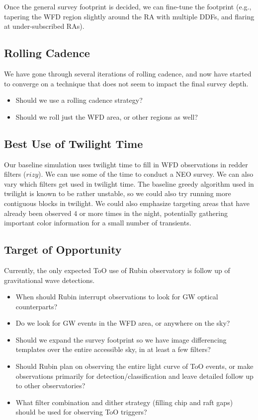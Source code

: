 Once the general survey footprint is decided, we can fine-tune the footprint (e.g., tapering the WFD region slightly around the RA with multiple DDFs, and flaring at under-subscribed RAs).

\subsection{Rolling Cadence}

We have gone through several iterations of rolling cadence, and now have started to converge on a technique that does not seem to impact the final survey depth. 

\begin{itemize}
    \item{Should we use a rolling cadence strategy?}
    \item{Should we roll just the WFD area, or other regions as well?}
\end{itemize}

\subsection{Best Use of Twilight Time}

Our baseline simulation uses twilight time to fill in WFD observations in redder filters ($rizy$). We can use some of the time to conduct a NEO survey. We can also vary which filters get used in twilight time. The baseline greedy algorithm used in twilight is known to be rather unstable, so we could also try running more contiguous blocks in twilight. We could also emphasize targeting areas that have already been observed 4 or more times in the night, potentially gathering important color information for a small number of transients.


\subsection{Target of Opportunity}

Currently, the only expected ToO use of Rubin observatory is follow up of gravitational wave detections.

\begin{itemize}
    \item{When should Rubin interrupt observations to look for GW optical counterparts?}
    \item{Do we look for GW events in the WFD area, or anywhere on the sky?}
    \item{Should we expand the survey footprint so we have image differencing templates over the entire accessible sky, in at least a few filters?}
    \item{Should Rubin plan on observing the entire light curve of ToO events, or make observations primarily for detection/classification and leave detailed follow up to other observatories?}
    \item{What filter combination and dither strategy (filling chip and raft gaps) should be used for observing ToO triggers? } 
\end{itemize}


